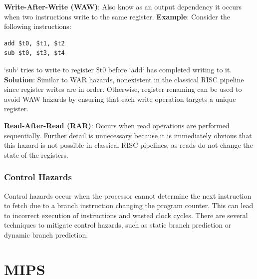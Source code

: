 \textbf{Write-After-Write (WAW)}: Also know as an output dependency it occurs when two instructions write to the same register.\newline
\textbf{Example}: Consider the following instructions:
\begin{verbatim}
add $t0, $t1, $t2
sub $t0, $t3, $t4
\end{verbatim}
`sub` tries to write to register \$t0 before `add` has completed writing to it.\newline
\textbf{Solution}: Similar to WAR hazards, nonexistent in the classical RISC pipeline since register writes are in order. Otherwise, register renaming can be used to avoid WAW hazards by ensuring that each write operation targets a unique register.

\textbf{Read-After-Read (RAR)}: Occurs when read operations are performed sequentially.\newline
Further detail is unnecessary because it is immediately obvious that this hazard is not possible in classical RISC pipelines, as reads do not change the state of the registers.



\subsubsection {Control Hazards}\label{sec:control_hazards}
Control hazards occur when the processor cannot determine the next instruction to fetch due to a branch instruction changing the program counter. This can lead to incorrect execution of instructions and wasted clock cycles. There are several techniques to mitigate control hazards, such as static branch prediction or dynamic branch prediction.\cite{pandey2016study}


\section {MIPS}\label{sec:mips}
